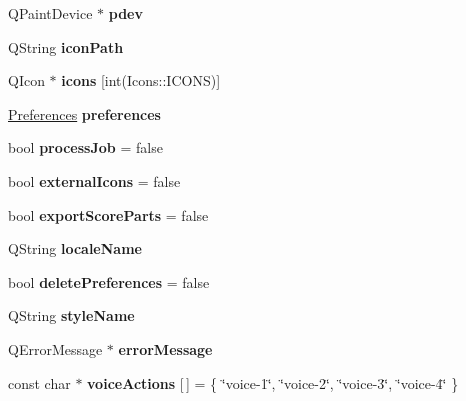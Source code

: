 \begin{DoxyCompactItemize}
\item 
\mbox{\label{namespace_ms_a8e11512e7e68bc9074b24d81c4b19927}} 
Q\+Paint\+Device $\ast$ {\bfseries pdev}
\item 
\mbox{\label{namespace_ms_a05e955a3fad4b2b18784bde00021fbb4}} 
Q\+String {\bfseries icon\+Path}
\item 
\mbox{\label{namespace_ms_a3f943d314730045983618ae8aecbf1b4}} 
Q\+Icon $\ast$ {\bfseries icons} \mbox{[}int(Icons\+::\+I\+C\+O\+NS)\mbox{]}
\item 
\mbox{\label{namespace_ms_abe8f8da5976e3a727f1a3a7a117e73de}} 
\hyperlink{struct_ms_1_1_preferences}{Preferences} {\bfseries preferences}
\item 
\mbox{\label{namespace_ms_ac7073386f0fcf23e13acd48424729284}} 
bool {\bfseries process\+Job} = false
\item 
\mbox{\label{namespace_ms_a44fe5e98b0807a1b73ab67296f299e28}} 
bool {\bfseries external\+Icons} = false
\item 
\mbox{\label{namespace_ms_ac5459107b7f0fb741b79c9783d8edc20}} 
bool {\bfseries export\+Score\+Parts} = false
\item 
\mbox{\label{namespace_ms_a646aa42b020e5180f7274372e9e32b24}} 
Q\+String {\bfseries locale\+Name}
\item 
\mbox{\label{namespace_ms_a2f2b472d6bffb39bd876a7ca6b58cbd3}} 
bool {\bfseries delete\+Preferences} = false
\item 
\mbox{\label{namespace_ms_a2d30054a5debd42236450014fb1a7d8a}} 
Q\+String {\bfseries style\+Name}
\item 
\mbox{\label{namespace_ms_addc0c1c84493b29580209e7a22110c30}} 
Q\+Error\+Message $\ast$ {\bfseries error\+Message}
\item 
\mbox{\label{namespace_ms_ada0c78f543ac40f1711316806e1da6ac}} 
const char $\ast$ {\bfseries voice\+Actions} \mbox{[}$\,$\mbox{]} = \{ \char`\"{}voice-\/1\char`\"{}, \char`\"{}voice-\/2\char`\"{}, \char`\"{}voice-\/3\char`\"{}, \char`\"{}voice-\/4\char`\"{} \}

\end{DoxyCompactItemize}
